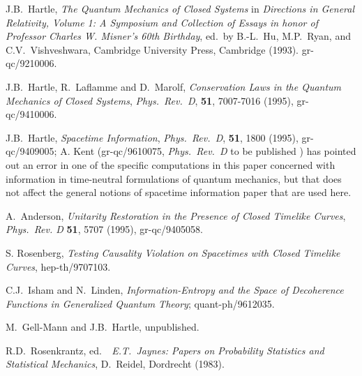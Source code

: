 \begin{references}
 J.B.~Hartle, {\it The Quantum Mechanics of Closed
Systems} in {\sl Directions in General Relativity,
Volume 1: A Symposium and Collection of Essays in honor of Professor
Charles W. Misner's 60th Birthday}, ed.~by B.-L.~Hu,
M.P.~Ryan, and C.V.~Vishveshwara, Cambridge University Press, Cambridge
(1993). gr-qc/9210006.


  J.B.~Hartle, R.~Laflamme and D.~Marolf,
{\it Conservation Laws in the Quantum Mechanics of Closed Systems},
{\sl Phys.~Rev.~D}, {\bf 51}, 7007-7016 (1995), gr-qc/9410006.

 J.B.~Hartle, {\it Spacetime Information},
{\sl Phys.~Rev.~D}, {\bf 51}, 1800 (1995), gr-qc/9409005; A. Kent
(gr-qc/9610075, {\sl Phys.~Rev.~D} to be published ) has pointed out an error in one of the 
specific computations in this paper concerned with information in time-neutral
formulations of quantum mechanics, but that does not affect the general notions of 
spacetime information paper that are used here. 

 A.~Anderson, {\it Unitarity Restoration in the Presence of Closed
 Timelike Curves},  {\sl Phys.~Rev. D} {\bf 51},  5707 (1995), gr-qc/9405058.

 S. Rosenberg, {\it Testing Causality Violation on Spacetimes with
Closed Timelike Curves}, hep-th/9707103.

 C.J.~Isham and N.~Linden,
 {\it Information-Entropy and
the Space of Decoherence
 Functions in Generalized Quantum Theory};  quant-ph/9612035.

 M.~Gell-Mann and J.B.~Hartle, unpublished.

 R.D.~Rosenkrantz,
ed.~{\sl ~E.T.~Jaynes: Papers on Probability Statistics and
Statistical Mechanics}, D.~Reidel,
Dordrecht (1983).


\end{references}






